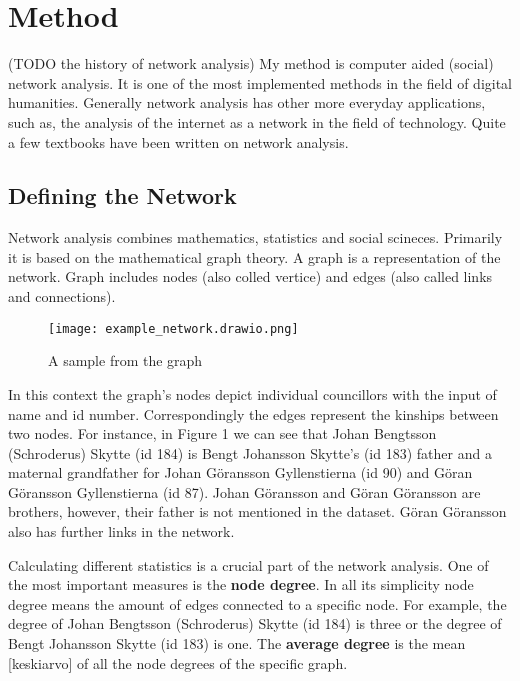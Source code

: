 \section{Method}
\label{method}

(TODO the history of network analysis)
My method is computer aided (social) network analysis. It is one of the most implemented methods in the field of digital humanities. Generally network analysis has other more everyday applications, such as, the analysis of the internet as a network in the field of technology. Quite a few textbooks have been written on network analysis.


\subsection{Defining the Network}
\label{network}
Network analysis combines mathematics, statistics and social scineces. Primarily it is based on the mathematical graph theory. A graph is a representation of the network. Graph includes nodes (also colled vertice) and edges (also called links and connections).

\begin{figure}[h]
	\texttt{[image: example\_network.drawio.png]}
	\centering
	\caption{A sample from the graph} 
	\centering
\end{figure}
In this context the graph's nodes depict individual councillors with the input of name and id number. Correspondingly the edges represent the kinships between two nodes. For instance, in Figure 1 we can see that Johan Bengtsson (Schroderus) Skytte (id 184) is Bengt Johansson Skytte's (id 183) father and a maternal grandfather for Johan Göransson Gyllenstierna (id 90) and Göran Göransson Gyllenstierna (id 87). Johan Göransson and Göran Göransson are brothers, however, their father is not mentioned in the dataset. Göran Göransson also has further links in the network. 

Calculating different statistics is a crucial part of the network analysis. One of the most important measures is the \textbf{node degree}. In all its simplicity node degree means the amount of edges connected to a specific node. For example, the degree of Johan Bengtsson (Schroderus) Skytte (id 184) is three or the degree of Bengt Johansson Skytte (id 183) is one. The \textbf{average degree} is the mean [keskiarvo] of all the node degrees of the specific graph. 

